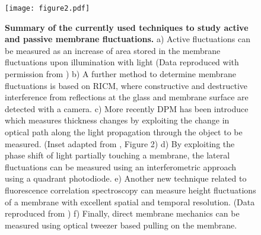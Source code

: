 \documentclass[graybox]{svmult}
\begin{document}
\begin{figure}
	\centering
		\texttt{[image: figure2.pdf]}
	\caption{\textbf{Summary of the currently used techniques to study active and passive membrane fluctuations.} a) Active fluctuations can be measured as an increase of area stored in the membrane fluctuations upon illumination with light (Data reproduced  with permission from \cite{Manneville:2001}) b) A further method to determine membrane fluctuations is based on RICM, where constructive and destructive interference from reflections at the glass and membrane surface are detected with a camera.  c) More recently DPM has been introduce which measures thickness changes by exploiting the change in optical path along the light propagation through the object to be measured. (Inset adapted from \cite{Park:2006}, Figure 2) d) By exploiting the phase shift of light partially touching a membrane, the lateral fluctuations can be measured using an interferometric approach using a quadrant photodiode.  e) Another new technique related to fluorescence correlation spectroscopy can measure height fluctuations of a membrane with excellent spatial and temporal resolution. (Data reproduced from \cite{Monzel:2015}) f) Finally, direct membrane mechanics can be measured using optical tweezer based pulling on the membrane.  }
	\label{fig:fig2}
\end{figure}
 
\end{document}
